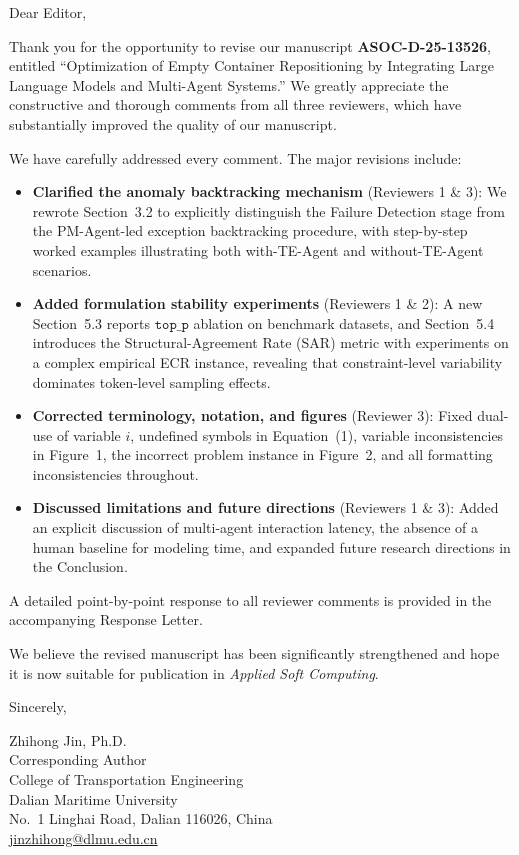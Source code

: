 \documentclass[12pt,a4paper]{article}
\begin{document}
\noindent Dear Editor,

\vspace{1em}

Thank you for the opportunity to revise our manuscript \textbf{ASOC-D-25-13526}, entitled ``Optimization of Empty Container Repositioning by Integrating Large Language Models and Multi-Agent Systems.'' We greatly appreciate the constructive and thorough comments from all three reviewers, which have substantially improved the quality of our manuscript.

We have carefully addressed every comment. The major revisions include:

\begin{itemize}
  \item \textbf{Clarified the anomaly backtracking mechanism} (Reviewers 1 \& 3): We rewrote Section~3.2 to explicitly distinguish the Failure Detection stage from the PM-Agent-led exception backtracking procedure, with step-by-step worked examples illustrating both with-TE-Agent and without-TE-Agent scenarios.

  \item \textbf{Added formulation stability experiments} (Reviewers 1 \& 2): A new Section~5.3 reports $\texttt{top\_p}$ ablation on benchmark datasets, and Section~5.4 introduces the Structural-Agreement Rate (SAR) metric with experiments on a complex empirical ECR instance, revealing that constraint-level variability dominates token-level sampling effects.

  \item \textbf{Corrected terminology, notation, and figures} (Reviewer 3): Fixed dual-use of variable $i$, undefined symbols in Equation~(1), variable inconsistencies in Figure~1, the incorrect problem instance in Figure~2, and all formatting inconsistencies throughout.

  \item \textbf{Discussed limitations and future directions} (Reviewers 1 \& 3): Added an explicit discussion of multi-agent interaction latency, the absence of a human baseline for modeling time, and expanded future research directions in the Conclusion.
\end{itemize}

A detailed point-by-point response to all reviewer comments is provided in the accompanying Response Letter.

We believe the revised manuscript has been significantly strengthened and hope it is now suitable for publication in \textit{Applied Soft Computing}.

\vspace{2em}

\noindent Sincerely,

\vspace{1.5em}

\noindent Zhihong Jin, Ph.D.\\
Corresponding Author\\
College of Transportation Engineering\\
Dalian Maritime University\\
No.~1 Linghai Road, Dalian 116026, China\\
\href{mailto:jinzhihong@dlmu.edu.cn}{jinzhihong@dlmu.edu.cn}
\end{document}
